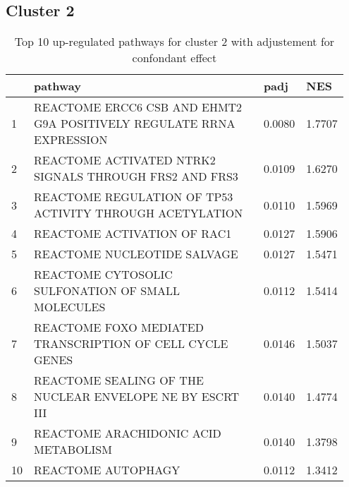 \documentclass{article}
\begin{document}
\subsection{Cluster 2 }
\begin{table}[H]
\centering
\begin{tabular}{p{0.05\linewidth}p{0.7\linewidth}p{0.1\linewidth}p{0.1\linewidth}}
  \hline
 & pathway & padj & NES \\ 
  \hline
1 & REACTOME ERCC6 CSB AND EHMT2 G9A POSITIVELY REGULATE RRNA EXPRESSION & 0.0080 & 1.7707 \\ 
  2 & REACTOME ACTIVATED NTRK2 SIGNALS THROUGH FRS2 AND FRS3 & 0.0109 & 1.6270 \\ 
  3 & REACTOME REGULATION OF TP53 ACTIVITY THROUGH ACETYLATION & 0.0110 & 1.5969 \\ 
  4 & REACTOME ACTIVATION OF RAC1 & 0.0127 & 1.5906 \\ 
  5 & REACTOME NUCLEOTIDE SALVAGE & 0.0127 & 1.5471 \\ 
  6 & REACTOME CYTOSOLIC SULFONATION OF SMALL MOLECULES & 0.0112 & 1.5414 \\ 
  7 & REACTOME FOXO MEDIATED TRANSCRIPTION OF CELL CYCLE GENES & 0.0146 & 1.5037 \\ 
  8 & REACTOME SEALING OF THE NUCLEAR ENVELOPE NE BY ESCRT III & 0.0140 & 1.4774 \\ 
  9 & REACTOME ARACHIDONIC ACID METABOLISM & 0.0140 & 1.3798 \\ 
  10 & REACTOME AUTOPHAGY & 0.0112 & 1.3412 \\ 
   \hline
\end{tabular}
\caption{Top 10 up-regulated pathways for cluster 2 with adjustement for confondant effect} 
\label{tab:q3_2_conf_2}
\end{table}
\end{document}
